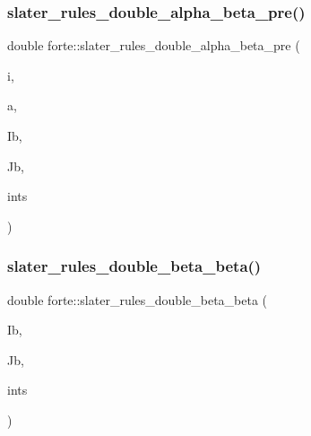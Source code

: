 \mbox{\label{namespaceforte_ac0d23dcdeb2163229bd1a4a9827be06c}} 
\subsubsection{\texorpdfstring{slater\+\_\+rules\+\_\+double\+\_\+alpha\+\_\+beta\+\_\+pre()}{slater\_rules\_double\_alpha\_beta\_pre()}}
{\footnotesize\ttfamily double forte\+::slater\+\_\+rules\+\_\+double\+\_\+alpha\+\_\+beta\+\_\+pre (\begin{DoxyParamCaption}\item[{int}]{i,  }\item[{int}]{a,  }\item[{\mbox{\hyperlink{namespaceforte_a840d1bfd3a8b3c16e09979212f37313f}{String}}}]{Ib,  }\item[{\mbox{\hyperlink{namespaceforte_a840d1bfd3a8b3c16e09979212f37313f}{String}}}]{Jb,  }\item[{const std\+::shared\+\_\+ptr$<$ \mbox{\hyperlink{classforte_1_1_active_space_integrals}{Active\+Space\+Integrals}} $>$ \&}]{ints }\end{DoxyParamCaption})}

\mbox{\label{namespaceforte_a477824ef87cc366861bc98839f9560b4}} 
\subsubsection{\texorpdfstring{slater\+\_\+rules\+\_\+double\+\_\+beta\+\_\+beta()}{slater\_rules\_double\_beta\_beta()}}
{\footnotesize\ttfamily double forte\+::slater\+\_\+rules\+\_\+double\+\_\+beta\+\_\+beta (\begin{DoxyParamCaption}\item[{\mbox{\hyperlink{namespaceforte_a840d1bfd3a8b3c16e09979212f37313f}{String}}}]{Ib,  }\item[{\mbox{\hyperlink{namespaceforte_a840d1bfd3a8b3c16e09979212f37313f}{String}}}]{Jb,  }\item[{const std\+::shared\+\_\+ptr$<$ \mbox{\hyperlink{classforte_1_1_active_space_integrals}{Active\+Space\+Integrals}} $>$ \&}]{ints }\end{DoxyParamCaption})}

